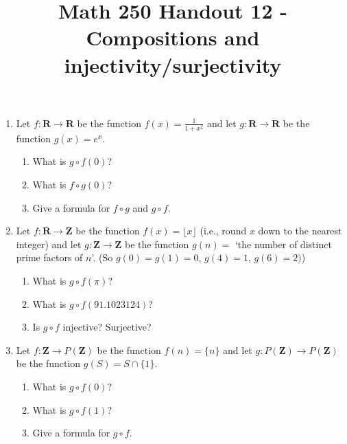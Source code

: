 \documentclass[12pt, reqno]{amsart}
\begin{document}
\title[Math 250 Handout 12 - Compositions and injectivity/surjectivity]{Math 250 Handout 12 - Compositions and injectivity/surjectivity}\maketitle


\begin{enumerate}


\item Let $f\colon \mathbf{R} \to \mathbf{R}$ be the function $f(x) = \frac{1}{1+x^2}$
  and let  $g\colon \mathbf{R} \to \mathbf{R}$ be the function $g(x) = e^x$. \vspace{6pt}

  \begin{enumerate}
  \item What is $g \circ f(0)$?
  \item What is $f \circ g(0)$?
  \item Give a formula for $f \circ g$ and $g \circ f$.
  \end{enumerate} \vspace{1.5in}

\item Let $f\colon \mathbf{R} \to \mathbf{Z}$ be the function $f(x) = \lfloor x \rfloor$ (i.e., round
  $x$ down to the nearest integer)
  and let  $g\colon \mathbf{Z} \to \mathbf{Z}$ be the function $g(n) = $ `the number
  of distinct
  prime factors of $n$'. (So $g(0) = g(1) = 0$, $g(4) = 1$, $g(6) =
  2)$) \vspace{6pt}

  \begin{enumerate}
  \item What is $g \circ f(\pi)$?
  \item What is $g \circ f(91.1023124)$?
  \item Is $g \circ f$ injective? Surjective?
  \end{enumerate} \vspace{1.5in}

\item Let $f\colon \mathbf{Z} \to P(\mathbf{Z})$ be the function $f(n) = \{n\}$
  and let  $g\colon P(\mathbf{Z}) \to P(\mathbf{Z})$ be the function $g(S) = S \cap \{1\}$. \vspace{6pt}

  \begin{enumerate}
  \item What is $g \circ f(0)$?
  \item What is $g \circ f(1)$?
  \item Give a formula for $g \circ f$.
  \end{enumerate} \vspace{1in}



\end{enumerate}
\end{document}
